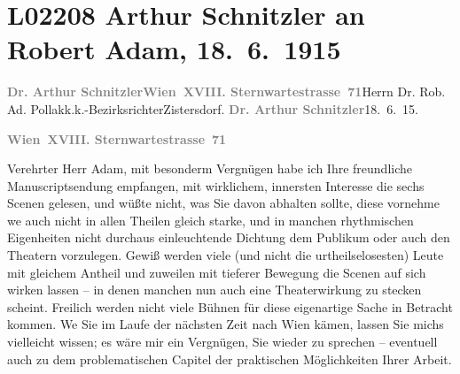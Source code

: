 

\section[Arthur Schnitzler an Robert Adam, 18. 6. 1915]{L02208 Arthur Schnitzler an Robert Adam, 18. 6. 1915}
\nopagebreak{}
\rehead{ }\normalsize\beginnumbering{}
\toendnotes[C]{\smallbreak\pagebreak[2]}
\toendnotes[C]{\smallbreak}\pstart{}{\pb}\textcolor{gray}{\textbf{Dr. Arthur Schnitzler}}\pend{}\pstart{}\textcolor{gray}{\textbf{Wien XVIII. Sternwartestrasse 71}}\pend{}{\bigskip}\pstart{}{\pb}Herrn Dr. Rob. Ad. Pollak\pend{}\pstart{}k.k.-Bezirksrichter\pend{}\pstart{}Zistersdorf.\pend{}{\bigskip}\vspace{1em}
\pstart
           {\pb}\textcolor{gray}{\textbf{Dr. Arthur Schnitzler}}\hfill 18. 6. 15.\pend
           
\pstart
           \textcolor{gray}{\textbf{Wien XVIII. Sternwartestrasse 71}}\pend
           
\pstart{}Verehrter Herr Adam,\pend\vspace{0.5em}
\pstart
           mit besonderm Vergnügen habe ich Ihre freundliche Manuscriptsendung empfangen, mit wirklichem, innersten
               Interesse die sechs Scenen gelesen, und wüßte nicht, was Sie davon abhalten sollte,
               diese vornehme we{\geminationn} auch nicht in allen Theilen gleich
               starke, und in manchen rhythmischen Eigenheiten nicht durchaus einleuchtende Dichtung
               dem Publikum oder auch den Theatern vorzulegen. Gewiß werden viele (und nicht die
               urtheilselosesten) {\pb}\introOben{}Leute\introOben{} mit gleichem Antheil und zuweilen mit tieferer
               Bewegung die Scenen auf sich wirken lassen – in denen manchen nun auch eine
               Theaterwirkung zu stecken scheint. Freilich werden nicht viele Bühnen für diese
               eigenartige Sache in Betracht kommen. We{\geminationn} Sie im Laufe
               der nächsten Zeit nach Wien kämen, lassen Sie
               michs vielleicht wissen; es wäre mir ein Vergnügen, Sie wieder zu sprechen –
               eventuell auch zu dem problematischen Capitel der praktischen Möglichkeiten Ihrer Arbeit.\pend
           
